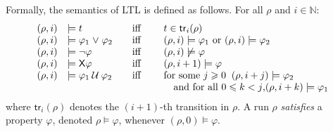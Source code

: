 \documentclass[10pt,a4paper]{article}
\let\mathbb\mathds
\renewcommand{\geq}{\geqslant}
\renewcommand{\leq}{\leqslant}
\newcommand{\nats}{\mathbb{N}}
\newcommand{\run}{\rho}
\newcommand*{\atrans}{t}
\newcommand*{\transat}[2]{\mathsf{tr}_{#2}(#1)}
\newcommand{\ltlnext}{\mathsf{X}}
\newcommand{\ltluntil}{\mathbin \mathcal{U}}
\newcommand{\U}{\ltluntil}
\newcommand{\Next}{\ltlnext}
\newcommand{\modelsLTL}{\ensuremath{\models}}
\newcommand{\Or}{\mathrel{\vee}}
\begin{document}
\begin{toappendix}
	Formally, the semantics of LTL is defined as follows.
	For all \(\run\) and \(i \in \nats\):
	\[
		\begin{array}{@{}rl@{\hspace{2em}}c@{\hspace{2em}}l@{}}
			(\run,i) & \modelsLTL t                       & \text{iff } & \atrans \in \transat{\run}{i}                                               \\
			(\run,i) & \modelsLTL \varphi_1 \Or \varphi_2 & \text{iff } & (\run,i)\modelsLTL \varphi_1 \text{ or } (\run,i)\modelsLTL \varphi_2       \\
			(\run,i) & \modelsLTL \neg \varphi            & \text{iff } & (\run,i) \not\modelsLTL \varphi                                             \\
			(\run,i) & \modelsLTL \Next \varphi           & \text{iff } & (\run,i+1)\modelsLTL \varphi                                                \\
			(\run,i) & \modelsLTL \varphi_1 \U \varphi_2  & \text{iff } & \text{for some } j\geq 0\;\; (\run,i+j)\modelsLTL \varphi_2                 \\
			         &                                    &             & \hspace{1em}\text{and for all \(0\leq k<j\),} (\run,i+k)\modelsLTL\varphi_1
		\end{array}
	\]
	where \(\transat{\run}{i}\) denotes the \((i+1)\)-th transition in \(\run\).
	A run \(\run\) \emph{satisfies} a property \(\varphi\), denoted \(\run\modelsLTL\varphi\), whenever \((\run,0)\modelsLTL\varphi\).
\end{toappendix}

%
%
%
%

%
%
%
%
%
%
%
%
%
%
%
\end{document}

